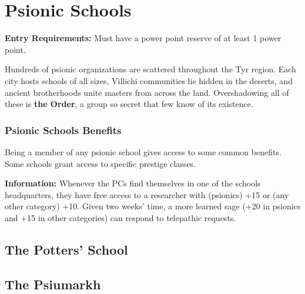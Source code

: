 \section{Psionic Schools}
\textbf{Entry Requirements:} Must have a power point reserve of at least 1 power point.

Hundreds of psionic organizations are scattered throughout the Tyr region. Each city hosts schools of all sizes, Villichi communities lie hidden in the deserts, and ancient brotherhoods unite masters from across the land. Overshadowing all of these is \textbf{the Order}, a group so secret that few know of its existence.

\subsubsection{Psionic Schools Benefits}
Being a member of any psionic school gives access to some common benefits. Some schools grant access to specific prestige classes.

\textbf{Information:} Whenever the PCs find themselves in one of the schools headquarters, they have free access to a researcher with  (psionics) +15 or  (any other category) +10. Given two weeks' time, a more learned sage (+20 in psionics and +15 in other categories) can respond to telepathic requests.





\subsection{The Potters' School}
\subsection{The Psiumarkh}